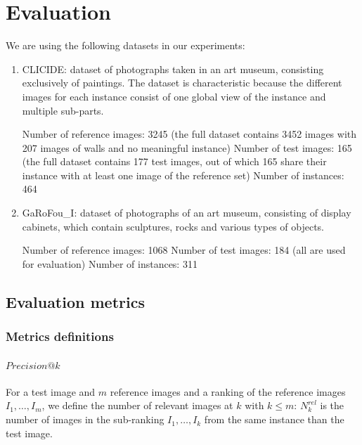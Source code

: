 \documentclass[fleqn]{article}
\begin{document}
\section{Evaluation}\label{sec:eval}
We are using the following datasets in our experiments:
\begin{enumerate}
    \item CLICIDE: dataset of photographs taken in an art museum,
    consisting exclusively of paintings. The dataset is characteristic
    because the different images for each instance consist of one
    global view of the instance and multiple sub-parts.

    Number of reference images: 3245 (the full dataset contains
    3452 images with 207 images of walls and no meaningful instance)
    Number of test images: 165 (the full dataset contains 177
    test images, out of which 165 share their instance with
    at least one image of the reference set)
    Number of instances: 464
    \item GaRoFou\_I: dataset of photographs of an art museum,
    consisting of display cabinets, which contain sculptures,
    rocks and various types of objects.

    Number of reference images: 1068
    Number of test images: 184 (all are used for evaluation)
    Number of instances: 311


\end{enumerate}

\subsection{Evaluation metrics}
\subsubsection{Metrics definitions}
\paragraph{$Precision@k$}
For a test image and $m$ reference images and a ranking of the
reference images $I_1, \dots, I_m$, we define the number of relevant
images at $k$ with $k \leq m$:
$N^{rel}_k$ is the number of images in the sub-ranking
$I_1, \dots, I_k$ from the same instance than the test image.
\end{document}
